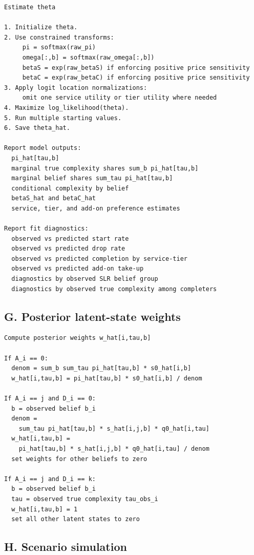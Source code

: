 \documentclass[11pt]{article}
\begin{document}
\begin{Verbatim}[fontsize=\small, frame=single]
Estimate theta

1. Initialize theta.
2. Use constrained transforms:
     pi = softmax(raw_pi)
     omega[:,b] = softmax(raw_omega[:,b])
     betaS = exp(raw_betaS) if enforcing positive price sensitivity
     betaC = exp(raw_betaC) if enforcing positive price sensitivity
3. Apply logit location normalizations:
     omit one service utility or tier utility where needed
4. Maximize log_likelihood(theta).
5. Run multiple starting values.
6. Save theta_hat.

Report model outputs:
  pi_hat[tau,b]
  marginal true complexity shares sum_b pi_hat[tau,b]
  marginal belief shares sum_tau pi_hat[tau,b]
  conditional complexity by belief
  betaS_hat and betaC_hat
  service, tier, and add-on preference estimates

Report fit diagnostics:
  observed vs predicted start rate
  observed vs predicted drop rate
  observed vs predicted completion by service-tier
  observed vs predicted add-on take-up
  diagnostics by observed SLR belief group
  diagnostics by observed true complexity among completers
\end{Verbatim}

\newpage
\subsection*{G. Posterior latent-state weights}

\begin{Verbatim}[fontsize=\small, frame=single]
Compute posterior weights w_hat[i,tau,b]

If A_i == 0:
  denom = sum_b sum_tau pi_hat[tau,b] * s0_hat[i,b]
  w_hat[i,tau,b] = pi_hat[tau,b] * s0_hat[i,b] / denom

If A_i == j and D_i == 0:
  b = observed belief b_i
  denom =
    sum_tau pi_hat[tau,b] * s_hat[i,j,b] * q0_hat[i,tau]
  w_hat[i,tau,b] =
    pi_hat[tau,b] * s_hat[i,j,b] * q0_hat[i,tau] / denom
  set weights for other beliefs to zero

If A_i == j and D_i == k:
  b = observed belief b_i
  tau = observed true complexity tau_obs_i
  w_hat[i,tau,b] = 1
  set all other latent states to zero
\end{Verbatim}

\newpage
\subsection*{H. Scenario simulation}
\end{document}

